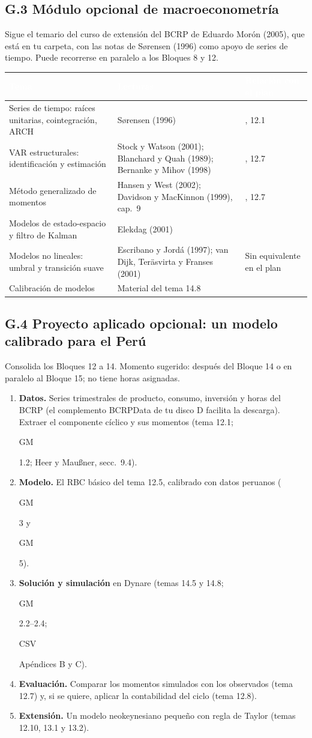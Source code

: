 \documentclass[11pt,a4paper]{article}
\newcommand{\cab}[1]{\textcolor{white}{\sffamily\bfseries #1}}
\newcommand{\filasalternas}{\rowcolors{2}{white}{tonoPalido}}
\newcommand{\etiqueta}[2]{%
  {\setlength{\fboxsep}{1.4pt}\colorbox{#1}{\sffamily\bfseries\color{white}\strut#2}}}
\newcommand{\CSV}[1]{\etiqueta{colorCSV}{CSV}\nobreak\hspace{0.25em}\textcolor{colorCSV}{#1}}
\newcommand{\GM}[1]{\etiqueta{colorGM}{GM}\nobreak\hspace{0.25em}\textcolor{colorGM}{#1}}
\begin{document}
\subsection*{G.3 Módulo opcional de macroeconometría}
Sigue el temario del curso de extensión del BCRP de Eduardo Morón (2005), que
está en tu carpeta, con las notas de Sørensen (1996) como apoyo de series de
tiempo. Puede recorrerse en paralelo a los Bloques 8 y 12.

\medskip
{\small\filasalternas
\noindent\begin{tabularx}{\textwidth}{>{\raggedright\arraybackslash}p{4.1cm}>{\raggedright\arraybackslash}X>{\raggedright\arraybackslash}p{3.2cm}}
\toprule
\rowcolor{tonoOscuro}\cab{Tema} & \cab{Lecturas} & \cab{Relación con el plan} \\
\midrule
Series de tiempo: raíces unitarias, cointegración, ARCH & Sørensen (1996) & 8.2, 12.1 \\
VAR estructurales: identificación y estimación & Stock y Watson (2001); Blanchard y Quah (1989); Bernanke y Mihov (1998) & 8.2, 12.7 \\
Método generalizado de momentos & Hansen y West (2002); Davidson y MacKinnon (1999), cap.~9 & 12.3, 12.7 \\
Modelos de estado-espacio y filtro de Kalman & Elekdag (2001) & 12.11 \\
Modelos no lineales: umbral y transición suave & Escribano y Jordá (1997); van Dijk, Teräsvirta y Franses (2001) & Sin equivalente en el plan \\
Calibración de modelos & Material del tema 14.8 & 14.8 \\
\bottomrule
\end{tabularx}
}

\subsection*{G.4 Proyecto aplicado opcional: un modelo calibrado para el Perú}
Consolida los Bloques 12 a 14. Momento sugerido: después del Bloque 14 o en
paralelo al Bloque 15; no tiene horas asignadas.
\begin{enumerate}[leftmargin=1.6em,itemsep=2pt]
  \item \textbf{Datos.} Series trimestrales de producto, consumo, inversión y horas del
        BCRP (el complemento BCRPData de tu disco D facilita la descarga). Extraer el
        componente cíclico y sus momentos (tema 12.1; \GM{1.2}; Heer y Maußner,
        secc.~9.4).
  \item \textbf{Modelo.} El RBC básico del tema 12.5, calibrado con datos peruanos
        (\GM{3} y \GM{5}).
  \item \textbf{Solución y simulación} en Dynare (temas 14.5 y 14.8; \GM{2.2--2.4};
        \CSV{Apéndices B y C}).
  \item \textbf{Evaluación.} Comparar los momentos simulados con los observados (tema
        12.7) y, si se quiere, aplicar la contabilidad del ciclo (tema 12.8).
  \item \textbf{Extensión.} Un modelo neokeynesiano pequeño con regla de Taylor
        (temas 12.10, 13.1 y 13.2).
\end{enumerate}
\end{document}
